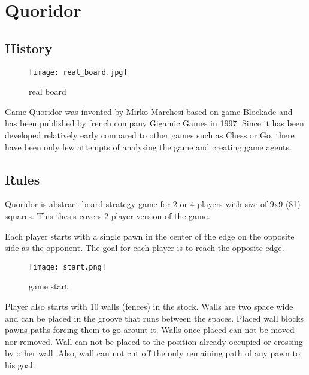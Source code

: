 \chapter{Quoridor}\label{chap:3}

\section{History}
\begin{wrapfigure}{R}{0.4\textwidth}
  \vspace*{-1.80cm}
  \centering
  \texttt{[image: real\_board.jpg]}
  \vspace*{-0.20cm}
  \caption{real board}
  \label{fig:quoridor_board}
  \vspace*{-1.40cm}
\end{wrapfigure}

Game Quoridor was invented by Mirko Marchesi based on game Blockade and
has been published by french company Gigamic Games in 1997. Since it has been
developed relatively early compared to other games such as Chess or Go, there
have been only few attempts of analysing the game and creating game agents.

\section{Rules}
Quoridor is abstract board strategy game for 2 or 4 players with size of
9x9 (81) squares. This thesis covers 2 player version of the game.

Each player starts with a single pawn in the center of the edge on the
opposite side as the opponent.
The goal for each player is to reach the opposite edge.

\begin{wrapfigure}{L}{0.35\textwidth}
  \vspace*{-0.60cm}
  \centering
  \texttt{[image: start.png]}
  \vspace*{-0.80cm}
  \label{fig:game_start}
  \caption{game start}
  \vspace*{-0.80cm}
\end{wrapfigure}

Player also starts with 10 walls (fences) in the stock.
Walls are two space wide and can be placed in the groove that runs between
the spaces.
Placed wall blocks pawns paths forcing them to go arount it.
Walls once placed can not be moved nor removed.
Wall can not be placed to the position already occupied or crossing by
other wall.
Also, wall can not cut off the only remaining path of any pawn to his goal.

